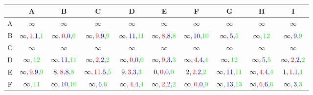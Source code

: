 \documentclass[a4paper,10pt]{article}
\begin{document}
\begin{table}[H]
\centering
\begin{tabular}{|c|c|c|c|c|c|c|c|c|c|} \hline
 & A & B & C & D & E & F & G & H & I  \\\hline
A & $ \infty $ & $ \infty$ & $ \infty$ & $ \infty$ & $ \infty$ & $\infty $ & $\infty$ & $\infty $ & $ \infty$ \\\hline
B & $\infty,{\color{red}1,}{\color{blue}1,}{\color{green}1} $ & $ \infty,{\color{red}0,}{\color{blue}0,}{\color{green}0}$ & $ \infty,{\color{red}9,}{\color{blue}9,}{\color{green}9}$ & $ \infty,{\color{blue}11,}{\color{green}11}$ & $ \infty,{\color{red}8,}{\color{blue}8,}{\color{green}8}$ & $\infty,{\color{blue}10,}{\color{green}10} $ & $\infty,{\color{blue}5,}{\color{green}5}$ & $\infty,{\color{green}12} $ & $ \infty,{\color{blue}9,}{\color{green}9}$ \\\hline
C & $\infty $ & $ \infty$ & $ \infty$ & $ \infty$ & $ \infty$ & $\infty $ & $\infty $ & $\infty $ & $ \infty$ \\\hline
D & $\infty,{\color{green}12}$ & $ \infty,{\color{blue}11,}{\color{green}11}$ & $ \infty,{\color{red}2,}{\color{blue}2,}{\color{green}2}$ & $ \infty,{\color{red}0,}{\color{blue}0,}{\color{green}0}$ & $ \infty,{\color{red}9,}{\color{blue}3,}{\color{green}3}$ & $\infty,{\color{red}4,}{\color{blue}4,}{\color{green}4} $ & $\infty,{\color{green}12} $ & $\infty,{\color{blue}5,}{\color{green}5} $ & $ \infty,{\color{red}2,}{\color{blue}2,}{\color{green}2}$ \\\hline
E & $\infty,{\color{red}9,}{\color{blue}9,}{\color{green}9} $ & $8,{\color{red}8,}{\color{blue}8,}{\color{green}8} $ & $\infty,{\color{red}11,}{\color{blue}5,}{\color{green}5} $ & $9,{\color{red}3,}{\color{blue}3,}{\color{green}3} $ & $ 0,{\color{red}0,}{\color{blue}0,}{\color{green}0}$ & $2,{\color{red}2,}{\color{blue}2,}{\color{green}2} $ & $\infty,{\color{blue}11,}{\color{green}11} $ & $\infty,{\color{red}4,}{\color{blue}4,}{\color{green}4} $ & $1,{\color{red}1,}{\color{blue}1,}{\color{green}1} $ \\\hline
F & $\infty,{\color{green}11} $ & $\infty,{\color{blue}10,}{\color{green}10} $ & $\infty,{\color{blue}6,}{\color{green}6} $ & $ \infty,{\color{red}4,}{\color{blue}4,}{\color{green}4}$ & $ \infty,{\color{red}2,}{\color{blue}2,}{\color{green}2}$ & $\infty,{\color{red}0,}{\color{blue}0,}{\color{green}0} $ & $\infty,{\color{blue}13,}{\color{green}13} $ & $\infty,{\color{red}6,}{\color{blue}6,}{\color{green}6} $ & $ \infty,{\color{blue}3,}{\color{green}3}$ \\\hline

\end{tabular}
\end{table}
\end{document}
